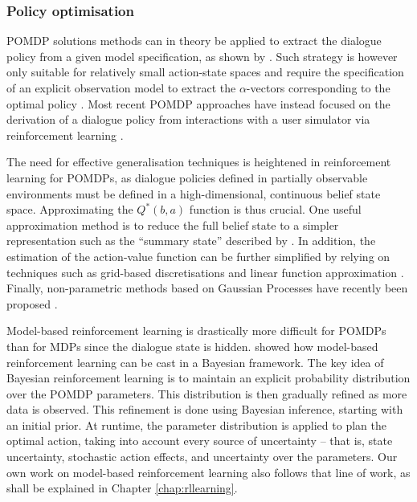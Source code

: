 \subsubsection*{Policy optimisation}

POMDP solutions methods can in theory be applied to extract the dialogue policy from a given model specification, as shown by \cite{Williams:2007,Williamsetal:2008}.  Such strategy is however only suitable for relatively small action-state spaces and require the specification of an explicit observation model to extract the $\alpha$-vectors corresponding to the optimal policy \citep{shani2013}. Most recent POMDP approaches have instead focused on the derivation of a dialogue policy from interactions with a user simulator via reinforcement learning \citep{Young:2010,Thomson:2010:BUD:1772996.1773040, daubigney2012}.

The need for effective generalisation techniques is heightened in reinforcement learning for POMDPs, as dialogue policies defined in partially observable environments must be defined in a high-dimensional, continuous belief state space.  Approximating the $Q^*(b,a)$ function is thus crucial. One useful approximation method is to reduce the full belief state to a simpler representation such as the ``summary state'' described by \cite{williams2005}. In addition, the estimation of the action-value function can be further simplified by relying on techniques such as grid-based discretisations \citep{Young:2010} and linear function approximation  \citep{Thomson:2010:BUD:1772996.1773040, daubigney2012}. Finally, non-parametric methods based on Gaussian Processes have recently been proposed \citep{gasic2011}. 

Model-based reinforcement learning is drastically more difficult for POMDPs than for MDPs since the dialogue state is hidden.  \cite{5946754} showed how model-based reinforcement learning can be cast in a Bayesian framework. The key idea of Bayesian reinforcement learning is to maintain an explicit probability distribution over the POMDP parameters. This distribution is then gradually refined as more data is observed. This refinement is done using Bayesian inference, starting with an initial prior.  At runtime, the parameter distribution is applied to plan the optimal action, taking into account every source of uncertainty -- that is, state uncertainty, stochastic action effects, and uncertainty over the parameters.  Our own work on model-based reinforcement learning also follows that line of work, as shall be explained in Chapter \ref{chap:rllearning}. 

